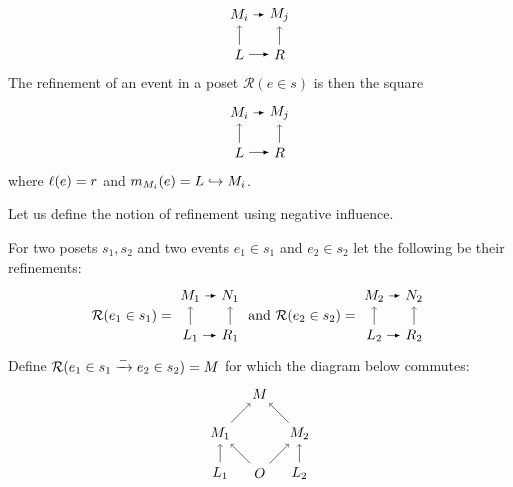 \begin{definition}
\begin{itemize}
\[    \begin{tikzpicture} %
      \node (mi) at (-2,1) {\(M_i\)};
      \node (mj) at (-1,1) {\(M_j\)};
      \node (r1) at (-1,0) {\(R\)};
      \node (l1) at (-2,0) {\(L\)};
      \draw [->] (l1) -- (mi);
      \draw [->] (r1) -- (mj);
      \draw [>=latex, ->] (mi) -- (mj);
      \draw [>=latex, ->] (l1) -- (r1);
    \end{tikzpicture}
    \]
    The refinement of an event in a poset $\mathcal{R}(e\in s)$ is then the square
    \[
    \begin{tikzpicture} %
      \node (mi) at (-2,1) {\(M_i\)};
      \node (mj) at (-1,1) {\(M_j\)};
      \node (r1) at (-1,0) {\(R\)};
      \node (l1) at (-2,0) {\(L\)};
      \draw [->] (l1) -- (mi);
      \draw [->] (r1) -- (mj);
      \draw [>=latex, ->] (mi) -- (mj);
      \draw [>=latex, ->] (l1) -- (r1);
    \end{tikzpicture}
    \]
    where $\ell(e) = r$ and $m_{M_i}(e) = L \hookrightarrow M_i$.
  \end{itemize}
\end{definition}

Let us define the notion of refinement using negative influence.

\begin{definition}
  For two posets $s_1,s_2$ and two events $e_1\in s_1$ and $e_2\in s_2$ let the following be their refinements:
  \begin{align*}
    \mathcal{R}(e_1\in s_1) =
    \begin{tikzpicture}[baseline=0.4cm] %
      \node (mi) at (-2,1) {\(M_1\)};
      \node (mj) at (-1,1) {\(N_1\)};
      \node (r1) at (-1,0) {\(R_1\)};
      \node (l1) at (-2,0) {\(L_1\)};
      \draw [->] (l1) -- (mi);
      \draw [->] (r1) -- (mj);
      \draw [>=latex, ->] (mi) -- (mj);
      \draw [>=latex, ->] (l1) -- (r1);
    \end{tikzpicture}
    \text{ and }
    \mathcal{R}(e_2\in s_2) =
    \begin{tikzpicture}[baseline=0.4cm] %
      \node (mi) at (-2,1) {\(M_2\)};
      \node (mj) at (-1,1) {\(N_2\)};
      \node (r1) at (-1,0) {\(R_2\)};
      \node (l1) at (-2,0) {\(L_2\)};
      \draw [->] (l1) -- (mi);
      \draw [->] (r1) -- (mj);
      \draw [>=latex, ->] (mi) -- (mj);
      \draw [>=latex, ->] (l1) -- (r1);
    \end{tikzpicture}
  \end{align*}
  Define $\mathcal{R}(e_1\in s_1\mathrel{\xrightarrow{-}} e_2\in s_2) = M$ for which the diagram below commutes:
  \[
  \begin{tikzpicture} %
    \node (o) at (0,0) {\(O\)};
    \node (n) at (0,2) {\(M\)};
    \node (l1) at (-1,0) {\(L_1\)};
    \node (l2) at (1,0) {\(L_2\)};
    \node (n1) at (-1,1) {\(M_1\)};
    \node (n2) at (1,1) {\(M_2\)};
    \draw [->] (l1) -- (n1);
    \draw [->] (l2) -- (n2);
    \draw [->] (o) -- (n1);
    \draw [->] (o) -- (n2);
    \draw [->] (n1) -- (n);
    \draw [->] (n2) -- (n);
  \end{tikzpicture}
  \]
\end{definition}

